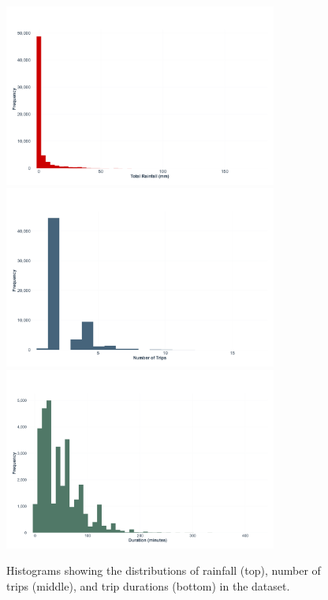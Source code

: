 \begin{figure}[H]
    \centering
    \includegraphics[width=0.8\textwidth]{../figures/rainfall_histogram.png}
    \includegraphics[width=0.8\textwidth]{../figures/trips_histogram.png}
    \includegraphics[width=0.8\textwidth]{../figures/duration_histogram.png}
    \caption{Histograms showing the distributions of rainfall (top), number of trips (middle), and trip durations (bottom) in the dataset.}
    \label{fig:hist}
\end{figure}

